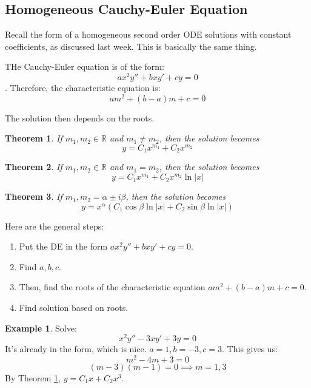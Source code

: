 \documentclass{article}
\newtheorem{thm}{Theorem}
\theoremstyle{definition}
\newtheorem{example}{Example}[section]
\begin{document}
\subsection{Homogeneous Cauchy-Euler Equation}

Recall the form of a homogeneous second order ODE solutions with constant coefficients, as discussed last week. This is basically the same thing. 

THe Cauchy-Euler equation is of the form:
\[ ax^2y'' + bxy' + cy = 0 \]. Therefore, the characteristic equation is:
\[am^2 + (b-a)m + c = 0 \]

The solution then depends on the roots. 
\begin{thm} \label{real distinct cauchyeuler}
    If $m_1, m_2 \in \mathbb{R}$ and $m_1 \neq m_2$, then the solution becomes 
    \[ 
    y = C_1x^{m_1}+C_2x^{m_2}
    \]
    \end{thm}
    
\begin{thm} \label{real repeated cauchyeuler}
    If $m_1, m_2 \in \mathbb{R}$ and $m_1 = m_2$, then the solution becomes 
        \[ 
            y = C_1x^{m_1}+C_2x^{m_2}\ln{\vert x \vert}
        \]
\end{thm}
    
\begin{thm} \label{complex cauchyeuler}
        If $m_1, m_2 = \alpha \pm i\beta$, then the solution becomes 
            \[ 
            y = x^{\alpha}(C_1\cos{\beta \ln{\vert x \vert}} + C_2\sin{\beta \ln{\vert x \vert}})
            \]
\end{thm}
Here are the general steps: 
\begin{enumerate}
    \item Put the DE in the form $ax^2y'' + bxy' + cy = 0$.
    \item Find $a, b, c$.
    \item Then, find the roots of the characteristic equation $am^2 + (b-a)m + c = 0$.
    \item Find solution based on roots. 
\end{enumerate}

\begin{example}
    Solve: \[x^2y''-3xy' + 3y = 0\]
    It's already in the form, which is nice. $a = 1, b = -3, c = 3$.
    This gives us: \[m^2 - 4m + 3 = 0\]
    \[(m-3)(m-1)= 0 \implies m = 1, 3\]
    By Theorem \ref{real distinct cauchyeuler}, $y = C_1x+C_2x^{3}$.
\end{example}
\end{document}
